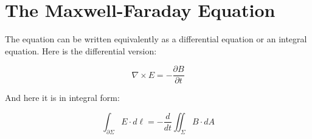 \documentclass[12pt]{article}
\begin{document}
\section*{The Maxwell-Faraday Equation}

The equation can be written equivalently as a differential equation or an
integral equation. Here is the differential version:

\[
\nabla\times E = -\dfrac{\partial B}{\partial t}
\]

And here it is in integral form:

\[
\int_{\partial \Sigma} E \cdot d\ell = -\dfrac{d}{dt}\iint_\Sigma B \cdot dA
\]
\end{document}
